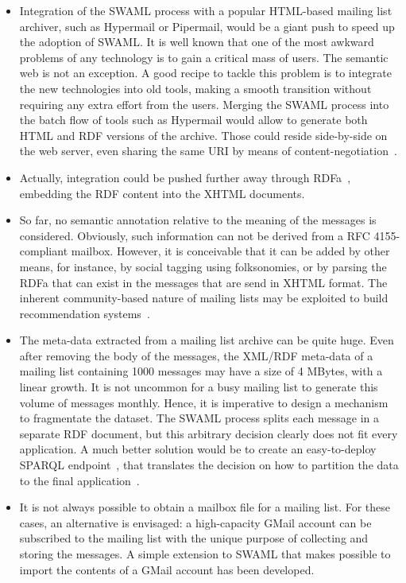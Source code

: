 \documentclass{llncs}
\begin{document}
\begin{itemize}
  \item Integration of the SWAML process with a popular HTML-based
        mailing list archiver, such as Hypermail or Pipermail, would be
        a giant push to speed up the adoption of SWAML. It is well
        known that one of the most awkward problems of any technology
        is to gain a critical mass of users. The semantic web is not
        an exception. A good recipe to tackle this problem is to
        integrate the new technologies into old tools, making
        a smooth transition without requiring any extra effort from
        the users. Merging the SWAML process into the batch flow of
        tools such as Hypermail would allow to generate both
        HTML and RDF versions of the archive. Those could reside
        side-by-side on the web server, even sharing the same URI
        by means of content-negotiation~\cite{Recipes}.
  \item Actually, integration could be pushed further away through
        RDFa~\cite{Birbeck2006}, embedding the RDF content into the
        XHTML documents.
  \item So far, no semantic annotation relative to the meaning of
        the messages is considered. Obviously, such information can not
        be derived from a RFC 4155-compliant mailbox.
        However, it is
        conceivable that it can be added by other means, for instance,
        by social tagging using folksonomies, or by parsing the RDFa
        that can exist in the messages that are send in XHTML format.
        The inherent community-based nature of mailing lists may
        be exploited to build recommendation systems~\cite{Celma2006}.
  \item The meta-data extracted from a mailing list archive can be
        quite huge. Even after removing the body of the messages, the
        XML/RDF meta-data of a mailing list containing 1000 messages may
        have a size of 4 MBytes, with a linear growth. It is not uncommon
        for a busy mailing list to generate this volume of messages
        monthly. Hence, it is imperative to design a mechanism to
        fragmentate the dataset. The SWAML process splits each message
        in a separate RDF document, but this arbitrary decision clearly
        does not fit every application. A much better solution would be to
        create an easy-to-deploy SPARQL endpoint~\cite{SPARQLProtocol},
        that translates the
        decision on how to partition the data to the final
        application~\cite{Pan2006}.
  \item It is not always possible to obtain a mailbox file for a mailing
        list. For these cases, an alternative is envisaged: a high-capacity
        GMail account can be subscribed to the mailing list with the unique
        purpose of collecting and storing the messages. A simple extension
        to SWAML that makes possible to import the contents of a GMail
        account has been developed.

\end{itemize}
\end{document}
